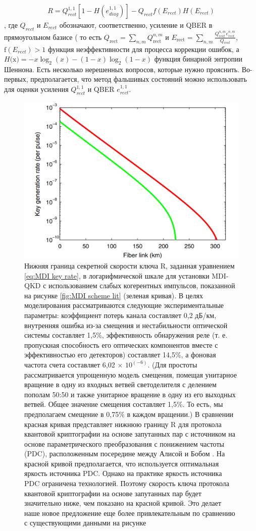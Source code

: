 \begin{align}
    R = Q_{rect}^{1,1}[1-H(e_{diag}^{1,1})] - Q_{rect}f(E_{rect})H(E_{rect})
\end{align} \label{eq:MDI key rate},
где $Q_{rect}$ и $E_{rect}$ обозначают, соответственно, усиление и QBER в прямоугольном базисе ( то есть $  Q_{\text{rect}} = \sum_{n,m} Q_{\text{rect}}^{n,m}  $ и $E_{\text{rect}} =\sum_{n,m} \frac{Q_{rect}^{n,m}e_{rect}^{n,m}}{Q_{rect}}$, $\text{f}(E_{rect}) > 1$ функция неэффективности для процесса коррекции ошибок, а $H\text{(x)} = - x\log_2(x) - (1 - x)\log_2(1-x) $  функция бинарной энтропии Шеннона. Есть несколько нерешенных вопросов, которые нужно прояснить. Во-первых, предполагается, что метод фальшивых состояний можно использовать для оценки усиления $Q_{rect}^{1,1}$ и QBER $e_{rect}^{1,1}$. 
\begin{figure}
    \centering
    \includegraphics[width=0.8\linewidth]{images/mdi speed.png}
    \caption{Нижняя граница секретной скорости ключа R, заданная уравнением \ref{eq:MDI key rate}, в логарифмической шкале для установки MDI-QKD с использованием слабых когерентных импульсов, показанной на рисунке \ref{fig:MDI scheme lit} (зеленая кривая). В целях моделирования рассматриваются следующие экспериментальные параметры: коэффициент потерь канала составляет 0,2 дБ/км, внутренняя ошибка из-за смещения и нестабильности оптической системы составляет 1,5\%, эффективность обнаружения реле (т. е. пропускная способность его оптических компонентов вместе с эффективностью его детекторов) составляет 14,5\%, а фоновая частота счета составляет 6,02 × $10^(-6)$. (Для простоты рассматривается упрощенную модель смещения, помещая унитарное вращение в одну из входных ветвей светоделителя с делением пополам 50:50 и также унитарное вращение в одну из его выходных ветвей. Общее значение смещения составляет 1,5\%. То есть, мы предполагаем смещение в 0,75\% в каждом вращении.) В сравнении красная кривая представляет нижнюю границу R для протокола квантовой криптографии на основе запутанных пар с источником на основе параметрического преобразования с понижением частоты (PDC), расположенным посередине между Алисой и Бобом \cite{ma2007}. На красной кривой предполагается, что используется оптимальная яркость источника PDC. Однако на практике яркость источника PDC ограничена технологией. Поэтому скорость ключа протокола квантовой криптографии на основе запутанных пар будет значительно ниже, чем показано на красной кривой. Это делает наше новое предложение еще более привлекательным по сравнению с существующими данными на рисунке}

\end{figure}
